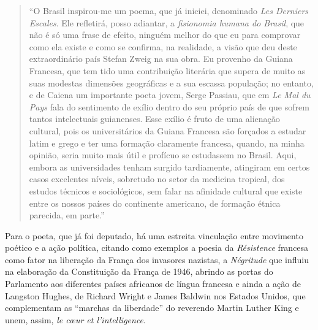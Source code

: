 \documentclass[
  letterpaper,
  DIV=11,
  numbers=noendperiod]{scrreprt}
\begin{document}
\begin{quote}
``O Brasil inspirou-me um poema, que já iniciei, denominado \emph{Les
Derniers Escales}. Ele refletirá, posso adiantar, a \emph{fisionomia
humana do Brasil}, que não é só uma frase de efeito, ninguém melhor do
que eu para comprovar como ela existe e como se confirma, na realidade,
a visão que deu deste extraordinário país Stefan Zweig na sua obra. Eu
provenho da Guiana Francesa, que tem tido uma contribuição literária que
supera de muito as suas modestas dimensões geográficas e a sua escassa
população; no entanto, e de Caiena um importante poeta jovem, Serge
Passiau, que em \emph{Le Mal du Pays} fala do sentimento de exílio
dentro do seu próprio país de que sofrem tantos intelectuais guianenses.
Esse exílio é fruto de uma alienação cultural, pois os universitários da
Guiana Francesa são forçados a estudar latim e grego e ter uma formação
claramente francesa, quando, na minha opinião, seria muito mais útil e
profícuo se estudassem no Brasil. Aqui, embora as universidades tenham
surgido tardiamente, atingiram em certos casos excelentes níveis,
sobretudo no setor da medicina tropical, dos estudos técnicos e
sociológicos, sem falar na afinidade cultural que existe entre os nossos
países do continente americano, de formação étnica parecida, em parte.''
\end{quote}

Para o poeta, que já foi deputado, há uma estreita vinculação entre
movimento poético e a ação política, citando como exemplos a poesia da
\emph{Résistence} francesa como fator na liberação da França dos
invasores nazistas, a \emph{Négritude} que influiu na elaboração da
Constituição da França de 1946, abrindo as portas do Parlamento aos
diferentes países africanos de língua francesa e ainda a ação de
Langston Hughes, de Richard Wright e James Baldwin nos Estados Unidos,
que complementam as ``marchas da liberdade'' do reverendo Martin Luther
King e unem, assim, \emph{le cœur et l'intelligence}.
\end{document}
